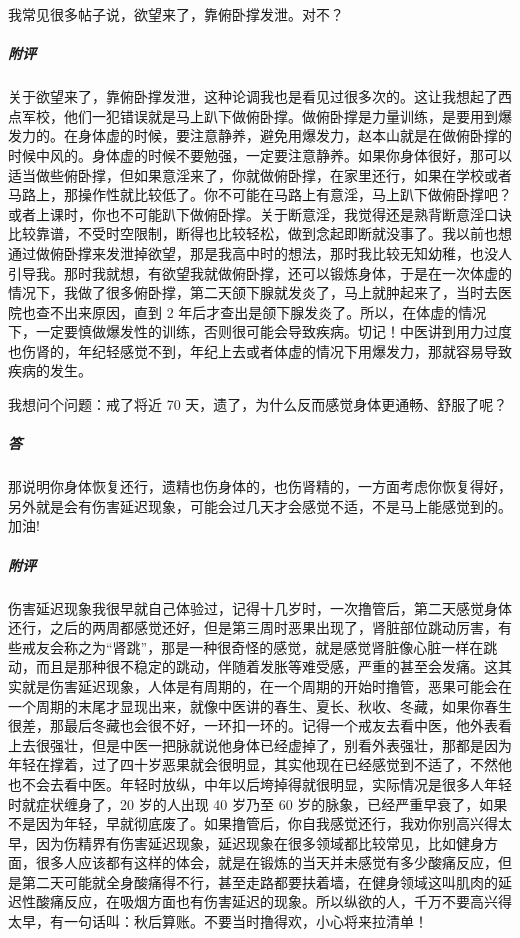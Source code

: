 \begin{case}
    我常见很多帖子说，欲望来了，靠俯卧撑发泄。对不？
    \subparagraph{附评} 关于欲望来了，靠俯卧撑发泄，这种论调我也是看见过很多次的。这让我想起了西点军校，他们一犯错误就是马上趴下做俯卧撑。做俯卧撑是力量训练，是要用到爆发力的。在身体虚的时候，要注意静养，避免用爆发力，赵本山就是在做俯卧撑的时候中风的。身体虚的时候不要勉强，一定要注意静养。如果你身体很好，那可以适当做些俯卧撑，但如果意淫来了，你就做俯卧撑，在家里还行，如果在学校或者马路上，那操作性就比较低了。你不可能在马路上有意淫，马上趴下做俯卧撑吧？或者上课时，你也不可能趴下做俯卧撑。关于断意淫，我觉得还是熟背断意淫口诀比较靠谱，不受时空限制，断得也比较轻松，做到念起即断就没事了。我以前也想通过做俯卧撑来发泄掉欲望，那是我高中时的想法，那时我比较无知幼稚，也没人引导我。那时我就想，有欲望我就做俯卧撑，还可以锻炼身体，于是在一次体虚的情况下，我做了很多俯卧撑，第二天颌下腺就发炎了，马上就肿起来了，当时去医院也查不出来原因，直到 2 年后才查出是颌下腺发炎了。所以，在体虚的情况下，一定要慎做爆发性的训练，否则很可能会导致疾病。切记！中医讲到用力过度也伤肾的，年纪轻感觉不到，年纪上去或者体虚的情况下用爆发力，那就容易导致疾病的发生。
\end{case}

\begin{case}
    我想问个问题：戒了将近 70 天，遗了，为什么反而感觉身体更通畅、舒服了呢？
    \subparagraph{答} 那说明你身体恢复还行，遗精也伤身体的，也伤肾精的，一方面考虑你恢复得好，另外就是会有伤害延迟现象，可能会过几天才会感觉不适，不是马上能感觉到的。加油!
    \subparagraph{附评} 伤害延迟现象我很早就自己体验过，记得十几岁时，一次撸管后，第二天感觉身体还行，之后的两周都感觉还好，但是第三周时恶果出现了，肾脏部位跳动厉害，有些戒友会称之为“肾跳”，那是一种很奇怪的感觉，就是感觉肾脏像心脏一样在跳动，而且是那种很不稳定的跳动，伴随着发胀等难受感，严重的甚至会发痛。这其实就是伤害延迟现象，人体是有周期的，在一个周期的开始时撸管，恶果可能会在一个周期的末尾才显现出来，就像中医讲的春生、夏长、秋收、冬藏，如果你春生很差，那最后冬藏也会很不好，一环扣一环的。记得一个戒友去看中医，他外表看上去很强壮，但是中医一把脉就说他身体已经虚掉了，别看外表强壮，那都是因为年轻在撑着，过了四十岁恶果就会很明显，其实他现在已经感觉到不适了，不然他也不会去看中医。年轻时放纵，中年以后垮掉得就很明显，实际情况是很多人年轻时就症状缠身了，20 岁的人出现 40 岁乃至 60 岁的脉象，已经严重早衰了，如果不是因为年轻，早就彻底废了。如果撸管后，你自我感觉还行，我劝你别高兴得太早，因为伤精界有伤害延迟现象，延迟现象在很多领域都比较常见，比如健身方面，很多人应该都有这样的体会，就是在锻炼的当天并未感觉有多少酸痛反应，但是第二天可能就全身酸痛得不行，甚至走路都要扶着墙，在健身领域这叫肌肉的延迟性酸痛反应，在吸烟方面也有伤害延迟的现象。所以纵欲的人，千万不要高兴得太早，有一句话叫：秋后算账。不要当时撸得欢，小心将来拉清单！
\end{case}

